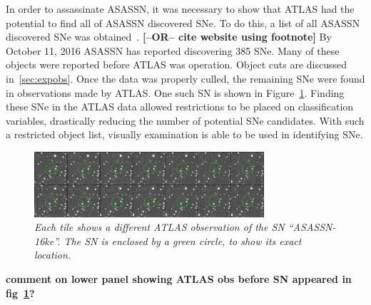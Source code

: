 \documentclass[aps,prb,twocolumn,superscriptaddress]{revtex4-1}
\begin{document}
\indent In order to assassinate ASASSN, 
it was necessary to show that ATLAS had the potential to find all of ASASSN discovered SNe. 
To do this, a list of all ASASSN discovered SNe was obtained~\cite{asn_data}. 
{\bf [--OR-- cite website using footnote]}
By October 11, 2016 
ASASSN has reported discovering 385 SNe. Many of these 
objects were reported before ATLAS was operation. Object cuts are discussed 
in~\cref{sec:expobs}. Once the data was properly culled, the remaining SNe 
were found in observations made by ATLAS. 
One such SN is shown in Figure~\ref{fig:ds9_ASASSN-16ke}.
Finding these SNe in the ATLAS 
data allowed restrictions to be placed on classification variables, drastically 
reducing the number of potential SNe candidates. With such a restricted object 
list, visually examination is able to be used in identifying SNe.\\ 


\begin{figure}[H]%
   \begin{center}
 \centerline{\includegraphics[width=3.35in]{figures/ds9_asn16ke.png}}
 \caption{\it \small{Each tile shows a different ATLAS observation of the SN ``ASASSN-16ke''. The SN is enclosed by a green circle, to show its exact location. \label{fig:ds9_ASASSN-16ke}}}
   \end{center}
\end{figure}
{\bf comment on lower panel showing ATLAS obs before SN appeared in fig~\ref{fig:ds9_ASASSN-16ke}?}




\end{document}
